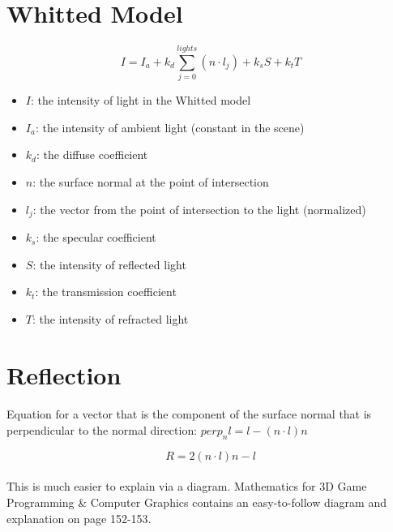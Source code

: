 \documentclass{article}
\begin{document}
\section{Whitted Model}

\[I = I_a + k_d\displaystyle\sum_{j=0}^{lights} (n \cdot l_j) + k_s S + k_t T\]

\begin{itemize}
\item \(I\): the intensity of light in the Whitted model
\item \(I_a\): the intensity of ambient light (constant in the scene)
\item \(k_d\): the diffuse coefficient
\item \(n\): the surface normal at the point of intersection
\item \(l_j\): the vector from the point of intersection to the light
  (normalized)
\item \(k_s\): the specular coefficient
\item \(S\): the intensity of reflected light 
\item \(k_t\): the transmission coefficient
\item \(T\): the intensity of refracted light
\end{itemize}

\section{Reflection}

\paragraph{}
Equation for a vector that is the component of the surface normal that is
perpendicular to the normal direction: \(perp_nl = l - (n \cdot l)n\)

\[R = 2(n \cdot l)n - l\]

\paragraph{}
This is much easier to explain via a diagram. Mathematics for 3D Game
Programming \& Computer Graphics contains an easy-to-follow diagram and
explanation on page 152-153.
\end{document}
